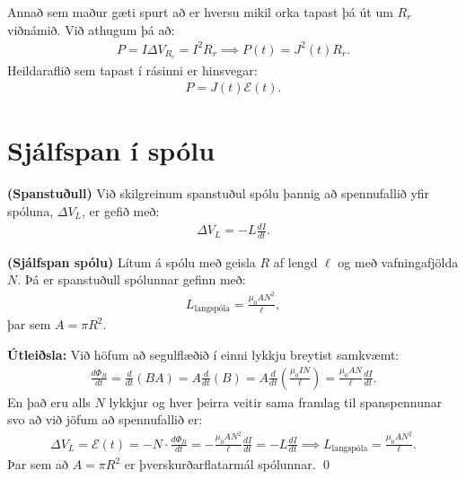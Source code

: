 \ifdefined \wholebook \else\documentclass[oneside]{book}\usepackage{EdlBook}\graphicspath{{figures/}}
\begin{document}
Annað sem maður gæti spurt að er hversu mikil orka tapast þá út um $R_r$ viðnámið. Við athugum þá að:
\begin{align*}
    P = I \Delta V_{R_r} = I^2 R_r \implies P(t) = J^2(t) R_r.
\end{align*}
Heildaraflið sem tapast í rásinni er hinsvegar:
\begin{align*}
    P = J(t)\mathcal{E}(t).
\end{align*}

\newpage

\section{Sjálfspan í spólu}

\begin{tcolorbox}
\begin{theorem}
\textbf{(Spanstuðull)} Við skilgreinum spanstuðul spólu þannig að spennufallið yfir spóluna, $\Delta V_L$, er gefið með:
\begin{align*}
    \Delta V_L = - L \frac{dI}{dt}.
\end{align*}
\end{theorem}
\end{tcolorbox}

\begin{tcolorbox}
\begin{theorem}
\textbf{(Sjálfspan spólu)} Lítum á spólu með geisla $R$ af lengd $\ell$ og með vafningafjölda $N$. Þá er spanstuðull spólunnar gefinn með:
\begin{align*}
    L_{\text{langspóla}} = \frac{\mu_0 A N^2}{\ell},
\end{align*}
þar sem $A = \pi R^2$.
\end{theorem}
\end{tcolorbox}

\textbf{Útleiðsla:} Við höfum að segulflæðið í einni lykkju breytist samkvæmt:
\begin{align*}
    \frac{d\Phi_B}{dt} = \frac{d}{dt}\left( BA \right) = A \frac{d}{dt}(B) = A \frac{d}{dt}\left( \frac{\mu_0 I N}{\ell} \right) = \frac{\mu_0 A N}{\ell} \frac{dI}{dt}.
\end{align*}
En það eru alls $N$ lykkjur og hver þeirra veitir sama framlag til spanspennunar svo að við jöfum að spennufallið er:
\begin{align*}
    \Delta V_L = \mathcal{E}(t) = -N \cdot \frac{d \Phi_B}{dt} = - \frac{\mu_0 A N^2}{\ell} \frac{dI}{dt} = -L \frac{dI}{dt} \implies L_{\text{langspóla}} = \frac{\mu_0 A N^2}{\ell}.
\end{align*}
Þar sem að $A = \pi R^2$ er þverskurðarflatarmál spólunnar. \qed
\end{document}

